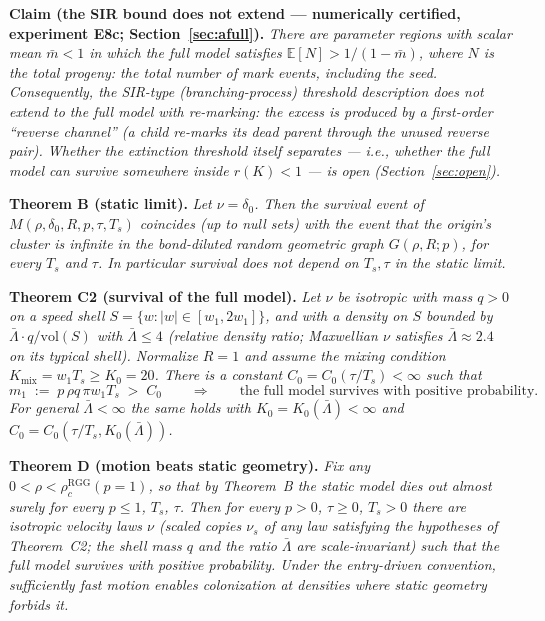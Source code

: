 \documentclass[11pt]{article}
\newenvironment{namedthm}[1]{\par\medskip\noindent\textbf{#1.}\itshape}{\par\medskip}
\newenvironment{namedprop}[1]{\par\medskip\noindent\textbf{#1.}\itshape}{\par\medskip}
\newcommand{\E}{\mathbb{E}}
\newcommand{\Kmix}{K_{\mathrm{mix}}}
\newcommand{\Ts}{T_s}
\newcommand{\relL}{\bar\Lambda}
\begin{document}
\begin{namedprop}{Claim (the SIR bound does not extend --- numerically certified, experiment E8c; Section~\ref{sec:afull})}
There are parameter regions with scalar mean $\bar m<1$ in which the full
model satisfies $\E[N]>1/(1-\bar m)$, where $N$ is the \emph{total
progeny}: the total number of mark events, including the seed. Consequently, \emph{the SIR-type
(branching-process) threshold description does not extend to the full model
with re-marking}: the excess is produced by a first-order
``reverse channel'' (a child re-marks its dead parent through the unused
reverse pair). Whether the extinction threshold itself separates --- i.e.,
whether the full model can survive somewhere inside $r(K)<1$ --- is open
(Section~\ref{sec:open}).
\end{namedprop}

\begin{namedthm}{Theorem B (static limit)}
Let $\nu=\delta_0$. Then the survival event of $M(\rho,\delta_0,R,p,\tau,\Ts)$
coincides (up to null sets) with the event that the origin's cluster is
infinite in the bond-diluted random geometric graph $G(\rho,R;p)$, for every
$\Ts$ and $\tau$. In particular survival does not depend on $\Ts,\tau$ in the
static limit.
\end{namedthm}

\begin{namedthm}{Theorem C2 (survival of the full model)}
Let $\nu$ be isotropic with mass $q>0$ on a speed shell
$S=\{w:|w|\in[w_1,2w_1]\}$, and with a density on $S$ bounded by
$\relL\cdot q/\mathrm{vol}(S)$ with $\relL\le 4$ (relative density ratio;
Maxwellian $\nu$ satisfies $\relL\approx2.4$ on its typical shell). Normalize
$R=1$ and assume the mixing condition $\Kmix=w_1\Ts\ge K_0=20$. There is a
constant $C_0=C_0(\tau/\Ts)<\infty$ such that
\[
  m_1 \;:=\; p\,\rho q\,\pi w_1\Ts \;>\; C_0
  \qquad\Longrightarrow\qquad
  \text{the full model survives with positive probability.}
\]
For general $\relL<\infty$ the same holds with $K_0=K_0(\relL)<\infty$ and
$C_0=C_0(\tau/\Ts,K_0(\relL))$.
\end{namedthm}

\begin{namedthm}{Theorem D (motion beats static geometry)}
Fix any $0<\rho<\rho_c^{\mathrm{RGG}}(p{=}1)$, so that by Theorem~B the
static model dies out almost surely for \emph{every} $p\le1$, $\Ts$, $\tau$.
Then for every $p>0$, $\tau\ge0$, $\Ts>0$ there are isotropic velocity laws
$\nu$ (scaled copies $\nu_s$ of any law satisfying the hypotheses of
Theorem~C2; the shell mass $q$ and the ratio $\relL$ are scale-invariant)
such that the full model survives with positive probability. Under the
entry-driven convention, \emph{sufficiently fast motion enables colonization
at densities where static geometry forbids it}.
\end{namedthm}
\end{document}
